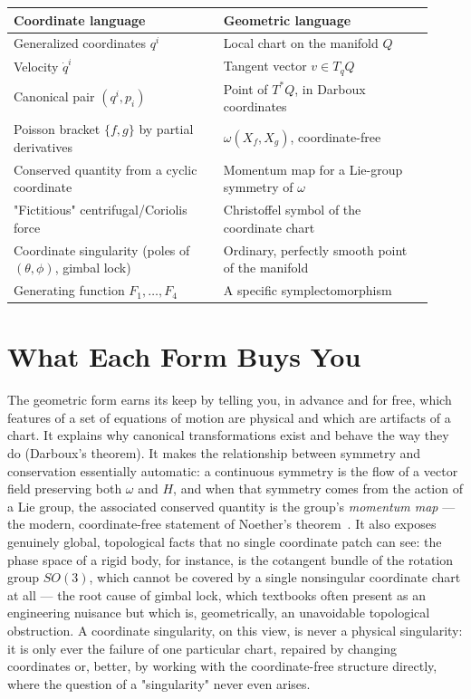 \begin{center}
\begin{tabular}{@{}p{0.46\linewidth}p{0.46\linewidth}@{}}
\toprule
\textbf{Coordinate language} & \textbf{Geometric language} \\
\midrule
Generalized coordinates $q^i$ &
  Local chart on the manifold $Q$ \\[2pt]
Velocity $\dot q^i$ &
  Tangent vector $v\in T_qQ$ \\[2pt]
Canonical pair $(q^i,p_i)$ &
  Point of $T^*Q$, in Darboux coordinates \\[2pt]
Poisson bracket $\{f,g\}$ by partial derivatives &
  $\omega(X_f,X_g)$, coordinate-free \\[2pt]
Conserved quantity from a cyclic coordinate &
  Momentum map for a Lie-group symmetry of $\omega$ \\[2pt]
"Fictitious" centrifugal/Coriolis force &
  Christoffel symbol of the coordinate chart \\[2pt]
Coordinate singularity (poles of $(\theta,\phi)$, gimbal lock) &
  Ordinary, perfectly smooth point of the manifold \\[2pt]
Generating function $F_1,\dots,F_4$ &
  A specific symplectomorphism \\
\bottomrule
\end{tabular}
\end{center}

\section{What Each Form Buys You}

The geometric form earns its keep by telling you, in advance and for
free, which features of a set of equations of motion are physical
and which are artifacts of a chart. It explains why canonical
transformations exist and behave the way they do (Darboux's
theorem). It makes the relationship between symmetry and conservation
essentially automatic: a continuous symmetry is the flow of a vector
field preserving both $\omega$ and $H$, and when that symmetry comes
from the action of a Lie group, the associated conserved quantity is
the group's \emph{momentum map} --- the modern, coordinate-free
statement of Noether's theorem~\cite{Noether1918,MarsdenRatiu1999}.
It also exposes genuinely global, topological facts that no single
coordinate patch can see: the phase space of a rigid body, for
instance, is the cotangent bundle of the rotation group $SO(3)$,
which cannot be covered by a single nonsingular coordinate chart at
all --- the root cause of gimbal lock, which textbooks often present
as an engineering nuisance but which is, geometrically, an
unavoidable topological obstruction. A coordinate singularity, on
this view, is never a physical singularity: it is only ever the
failure of one particular chart, repaired by changing coordinates or,
better, by working with the coordinate-free structure directly, where
the question of a "singularity" never even arises.

